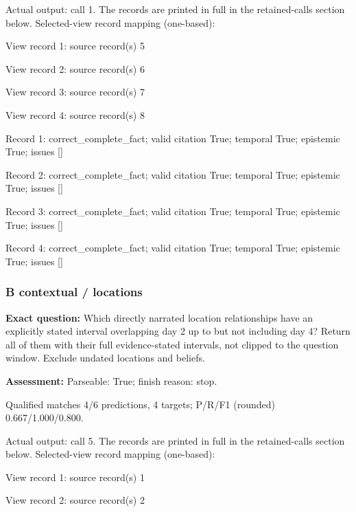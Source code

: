 Actual output: call 1. The records are printed in full in the retained-calls section below. Selected-view record mapping (one-based):

View record 1: source record(s) 5\par

View record 2: source record(s) 6\par

View record 3: source record(s) 7\par

View record 4: source record(s) 8\par

Record 1: correct\_complete\_fact; valid citation True; temporal True; epistemic True; issues []\par

Record 2: correct\_complete\_fact; valid citation True; temporal True; epistemic True; issues []\par

Record 3: correct\_complete\_fact; valid citation True; temporal True; epistemic True; issues []\par

Record 4: correct\_complete\_fact; valid citation True; temporal True; epistemic True; issues []\par

\subsubsection*{B contextual / locations}

\noindent\textbf{Exact question:} Which directly narrated location relationships have an explicitly stated interval overlapping day 2 up to but not including day 4? Return all of them with their full evidence-stated intervals, not clipped to the question window. Exclude undated locations and beliefs.\par

\noindent\textbf{Assessment:} Parseable: True; finish reason: stop.

Qualified matches 4/6 predictions, 4 targets; P/R/F1 (rounded) 0.667/1.000/0.800.\par

Actual output: call 5. The records are printed in full in the retained-calls section below. Selected-view record mapping (one-based):

View record 1: source record(s) 1\par

View record 2: source record(s) 2\par

